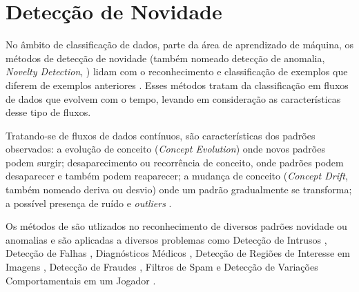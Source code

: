 
\section{Detecção de Novidade}\label{sec:nd}

\newcommand{\novelty}{\emph{Novelty Detection}\xspace}
\newcommand{\drift}{\emph{Concept Drift}\xspace}
\newcommand{\evolution}{\emph{Concept Evolution}\xspace}

No âmbito de classificação de dados, parte da área de aprendizado de máquina, os
métodos de detecção de novidade (também nomeado detecção de anomalia, \novelty,
\nd) lidam com o reconhecimento e classificação de exemplos que diferem de
exemplos anteriores \cite{PERNER2007,Gama2010}.
Esses métodos tratam da classificação em fluxos de dados que evolvem com o
tempo, levando em consideração as características desse tipo de fluxos.


Tratando-se de fluxos de dados contínuos, são características dos padrões observados:
a evolução de conceito (\evolution) onde novos padrões podem surgir;
desaparecimento ou recorrência de conceito, onde padrões podem desaparecer e
também podem reaparecer;
a mudança de conceito (\drift, também nomeado deriva ou desvio) onde um padrão
gradualmente se transforma;
a possível presença de ruído e \emph{outliers} \cite{Gama2010}.


Os métodos de \nd são utlizados no reconhecimento de diversos padrões novidade
ou anomalias e são aplicadas a diversos problemas como
Detecção de Intrusos \cite{Coull2003,Spinosa2008,Viegas2019,Cassales2019a},
Detecção de Falhas \cite{Zhang2006},
Diagnósticos Médicos \cite{Perner2009},
Detecção de Regiões de Interesse em Imagens \cite{singh2004approach},
Detecção de Fraudes \cite{wang2003mining,Abdallah201690}, 
Filtros de Spam \cite{Hayat2010dct} e
Detecção de Variações Comportamentais em um Jogador \cite{Vallim20136258}.

